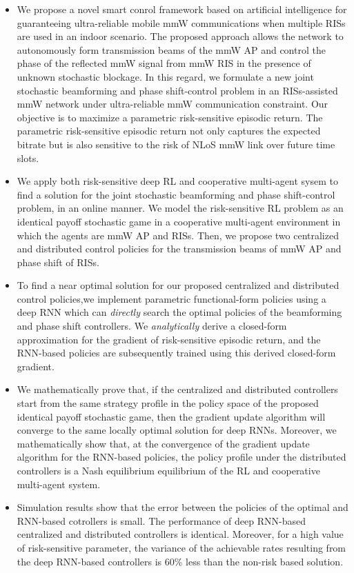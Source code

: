 \documentclass[conference]{IEEEtran}
\begin{document}
\begin{itemize}
\item We propose a novel smart conrol framework based on artificial intelligence for guaranteeing ultra-reliable mobile mmW communications when multiple RISs are used in an indoor scenario. The proposed approach allows the network to autonomously form transmission beams of the mmW AP and control the phase of the reflected mmW signal from mmW RIS in the presence of unknown stochastic blockage. In this regard, we formulate a new joint stochastic beamforming and phase shift-control problem in an RISs-assisted mmW network under ultra-reliable mmW communication constraint. Our objective is to maximize a parametric risk-sensitive episodic return. The parametric risk-sensitive episodic return not only captures the expected bitrate but is also sensitive to the risk of NLoS mmW link over future time slots.

\item We apply both risk-sensitive deep RL and cooperative multi-agent sysem to find a solution for the joint stochastic beamforming and phase shift-control problem, in an online manner. We model the risk-sensitive RL problem as an identical payoff stochastic game in a cooperative multi-agent environment in which the agents are mmW AP and RISs. Then, we propose two centralized and distributed control policies for the transmission beams of mmW AP and phase shift of RISs.

\item To find a near optimal solution for our proposed centralized and distributed control policies,we implement parametric functional-form policies using a deep RNN which can \emph{directly} search the optimal policies of the beamforming and phase shift controllers. We \emph{analytically} derive a closed-form approximation for the gradient of risk-sensitive episodic return, and the RNN-based policies are subsequently trained using this derived closed-form gradient.

\item We mathematically prove that, if the centralized and distributed controllers start from the same strategy profile in the policy space of the proposed identical payoff stochastic game, then the gradient update algorithm will converge to the same locally optimal solution for deep RNNs.  Moreover, we mathematically show that, at the convergence of the gradient update algorithm for the RNN-based policies, the policy profile under the distributed controllers is a Nash equilibrium equilibrium of the RL and cooperative multi-agent system.

\item Simulation results show that the error between the policies of the optimal and RNN-based cotrollers is small. The performance of deep RNN-based centralized and distributed controllers is identical. Moreover, for a high value of risk-sensitive parameter, the variance of the achievable rates resulting from the deep RNN-based controllers is 60\% less than the non-risk based solution.
\end{itemize}
\end{document}
